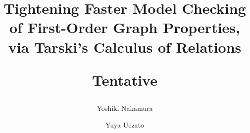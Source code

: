 \documentclass[a4paper,UKenglish,cleveref, autoref, thm-restate]{lipics-v2021}
\title{Tightening Faster Model Checking of First-Order Graph Properties, via Tarski's Calculus of Relations \begin{sideyoshiki}Tentative\end{sideyoshiki}} %
\author{Yoshiki Nakamura}{Science Tokyo, Japan}{mail}{https://orcid.org/0000-0003-4106-0408}{}
\author{Yuya Uezato}{CyberAgent, Inc., Japan}{mail}{https://orcid.org/0009-0005-8834-010X}{}
\begin{document}
\maketitle

\begin{abstract}

\end{abstract}






% 




% 

\clearpage
\appendix


\clearpage

\end{document}
